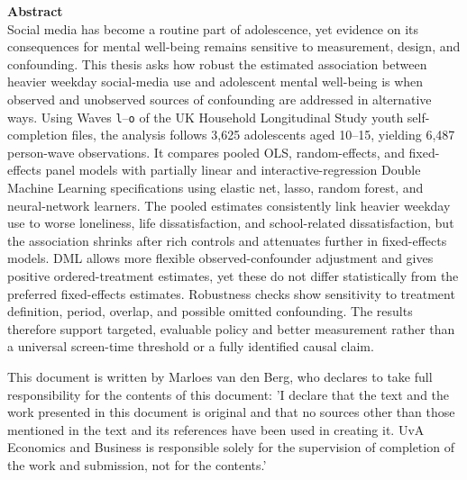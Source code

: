 \documentclass[11pt,oneside,a4paper]{book}
\renewcommand{\baselinestretch}{1.3}
\begin{document}
\begin{titlepage}
\begin{minipage}{0.90\textwidth}
{\renewcommand{\baselinestretch}{1.0}\selectfont
\footnotesize
\noindent\textbf{Abstract}\\[0.18cm]
\noindent Social media has become a routine part of adolescence, yet evidence on its consequences for mental well-being remains sensitive to measurement, design, and confounding. This thesis asks how robust the estimated association between heavier weekday social-media use and adolescent mental well-being is when observed and unobserved sources of confounding are addressed in alternative ways. Using Waves \texttt{l}--\texttt{o} of the UK Household Longitudinal Study youth self-completion files, the analysis follows 3,625 adolescents aged 10--15, yielding 6,487 person-wave observations. It compares pooled OLS, random-effects, and fixed-effects panel models with partially linear and interactive-regression Double Machine Learning specifications using elastic net, lasso, random forest, and neural-network learners. The pooled estimates consistently link heavier weekday use to worse loneliness, life dissatisfaction, and school-related dissatisfaction, but the association shrinks after rich controls and attenuates further in fixed-effects models. DML allows more flexible observed-confounder adjustment and gives positive ordered-treatment estimates, yet these do not differ statistically from the preferred fixed-effects estimates. Robustness checks show sensitivity to treatment definition, period, overlap, and possible omitted confounding. The results therefore support targeted, evaluable policy and better measurement rather than a universal screen-time threshold or a fully identified causal claim.
\par}
\end{minipage}

\vspace*{0.65cm}
\end{titlepage}

\newpage
{}

\noindent This document is written by  Marloes van den Berg, who declares to take full responsibility for the contents of this document: 'I declare that the text
and the work presented in this document is original and that no sources other than those
mentioned in the text and its references have been used in creating it. UvA Economics and Business is
responsible solely for the supervision of completion of the work and submission, not for the
contents.'

\hypersetup{linkcolor=black}
\tableofcontents
\hypersetup{linkcolor=ThesisLinkBlue}
\end{document}
